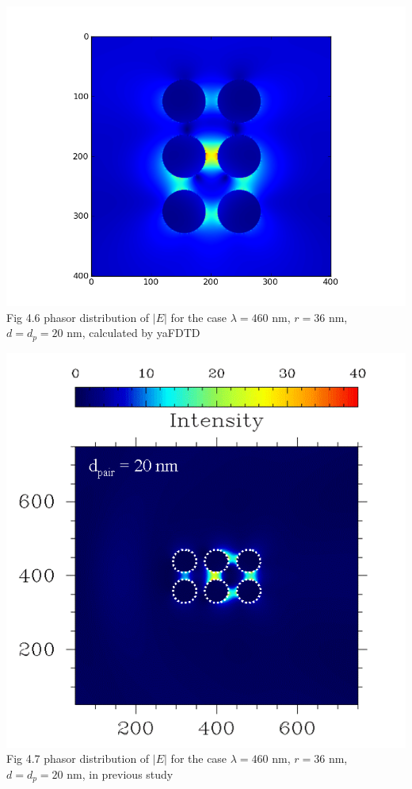 \documentclass[openany]{book}
\begin{document}
\begin{center}
\includegraphics[scale=0.8]{images/etotal.png}\\
Fig 4.6
phasor distribution of $|E|$ for the case $\lambda = 460$ nm, $r = 36$ nm, $d = d_p = 20$ nm, calculated by yaFDTD
\end{center}
\begin{center}
\includegraphics[scale=0.5]{images/r36.png}\\
Fig 4.7
phasor distribution of $|E|$ for the case $\lambda = 460$ nm, $r = 36$ nm, $d = d_p = 20$ nm, in previous study
\end{center}
\end{document}
